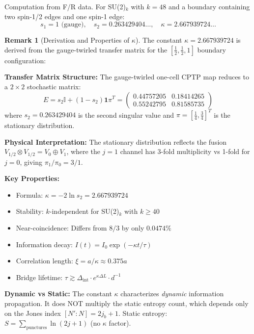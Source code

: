 \documentclass[11pt]{article}
\theoremstyle{plain}
\theoremstyle{definition}
\newtheorem{remark}[theorem]{Remark}
\begin{document}
Computation from F/R data. For SU(2)$_k$ with $k = 48$ and a boundary containing two spin-1/2 edges and one spin-1 edge:
\[
  s_1 = 1 \text{ (gauge)}, \quad s_2 = 0.263429404\ldots, \quad \kappa = 2.667939724\ldots \tag{5}
\]

\begin{remark}[Derivation and Properties of $\kappa$]\label{rem:kappa-derivation}
  The constant $\kappa = 2.667939724$ is derived from the gauge-twirled transfer matrix for the $[\frac{1}{2}, \frac{1}{2}, 1]$ boundary configuration:

  \textbf{Transfer Matrix Structure:} The gauge-twirled one-cell CPTP map reduces to a $2 \times 2$ stochastic matrix:
  \begin{equation}
    E = s_2 \mathbb{I} + (1 - s_2) \mathbf{1} \pi^T =
    \begin{pmatrix}
      0.44757205 & 0.18414265 \\
      0.55242795 & 0.81585735
    \end{pmatrix}
  \end{equation}
  where $s_2 = 0.263429404$ is the second singular value and $\pi = [\frac{1}{4}, \frac{3}{4}]^T$ is the stationary distribution.

  \textbf{Physical Interpretation:} The stationary distribution reflects the fusion $V_{1/2} \otimes V_{1/2} = V_0 \oplus V_1$, where the $j=1$ channel has 3-fold multiplicity vs 1-fold for $j=0$, giving $\pi_1/\pi_0 = 3/1$.

  \textbf{Key Properties:}
  \begin{itemize}
    \item Formula: $\kappa = -2\ln s_2 = 2.667939724$
    \item Stability: $k$-independent for SU(2)$_k$ with $k \geq 40$
    \item Near-coincidence: Differs from $8/3$ by only $0.0474\%$
    \item Information decay: $I(t) = I_0 \exp(-\kappa t/\tau)$
    \item Correlation length: $\xi = a/\kappa \approx 0.375a$
    \item Bridge lifetime: $\tau \gtrsim \Delta_{\text{int}} \cdot e^{\kappa\Delta L} \cdot d^{-1}$
  \end{itemize}

  \textbf{Dynamic vs Static:} The constant $\kappa$ characterizes \emph{dynamic} information propagation. It does NOT multiply the static entropy count, which depends only on the Jones index $[N':N] = 2j_b + 1$. Static entropy: $S = \sum_{\text{punctures}} \ln(2j + 1)$ (no $\kappa$ factor).
\end{remark}
\end{document}
